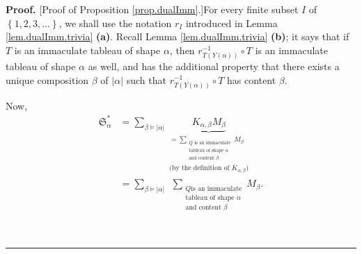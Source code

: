 \documentclass
[numbers=enddot,12pt,final,onecolumn,notitlepage,abstracton]{scrartcl}%
\theoremstyle{definition}
\newenvironment{proof}[1][Proof]{\noindent\textbf{#1.} }{\ \rule{0.5em}{0.5em}}
\let\sumnonlimits\sum
\renewcommand{\sum}{\sumnonlimits\limits}
\begin{document}
\begin{proof}
[Proof of Proposition \ref{prop.dualImm}.]For every finite subset $I$ of
$\left\{  1,2,3,\ldots\right\}  $, we shall use the notation $r_{I}$
introduced in Lemma \ref{lem.dualImm.trivia} \textbf{(a)}. Recall Lemma
\ref{lem.dualImm.trivia} \textbf{(b)}; it says that if $T$ is an immaculate
tableau of shape $\alpha$, then $r_{T\left(  Y\left(  \alpha\right)  \right)
}^{-1}\circ T$ is an immaculate tableau of shape $\alpha$ as well, and has the
additional property that there exists a unique composition $\beta$ of
$\left\vert \alpha\right\vert $ such that $r_{T\left(  Y\left(  \alpha\right)
\right)  }^{-1}\circ T$ has content $\beta$.

Now,
\begin{align}
\mathfrak{S}_{\alpha}^{\ast}  & =\sum_{\beta\models\left\vert \alpha
\right\vert }\underbrace{K_{\alpha,\beta}M_{\beta}}_{\substack{=\sum
_{\substack{Q\text{ is an immaculate}\\\text{tableau of shape }\alpha
\\\text{and content }\beta}}M_{\beta}\\\text{(by the definition of }%
K_{\alpha,\beta}\text{)}}}\nonumber\\
& =\sum_{\beta\models\left\vert \alpha\right\vert }\ \ \sum_{\substack{Q\text{
is an immaculate}\\\text{tableau of shape }\alpha\\\text{and content }\beta
}}M_{\beta}.\label{pf.dualImm.1}%
\end{align}



\end{proof}
\end{document}
